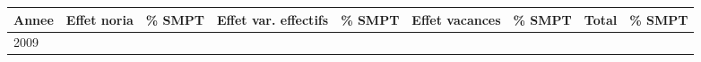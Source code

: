 \begin{longtable}[]{@{}lllllllll@{}}
\toprule
\begin{minipage}[b]{0.05\columnwidth}\raggedright
Annee\strut
\end{minipage} & \begin{minipage}[b]{0.10\columnwidth}\raggedright
Effet noria\strut
\end{minipage} & \begin{minipage}[b]{0.06\columnwidth}\raggedright
\% SMPT\strut
\end{minipage} & \begin{minipage}[b]{0.16\columnwidth}\raggedright
Effet var. effectifs\strut
\end{minipage} & \begin{minipage}[b]{0.06\columnwidth}\raggedright
\% SMPT\strut
\end{minipage} & \begin{minipage}[b]{0.12\columnwidth}\raggedright
Effet vacances\strut
\end{minipage} & \begin{minipage}[b]{0.06\columnwidth}\raggedright
\% SMPT\strut
\end{minipage} & \begin{minipage}[b]{0.09\columnwidth}\raggedright
Total\strut
\end{minipage} & \begin{minipage}[b]{0.06\columnwidth}\raggedright
\% SMPT\strut
\end{minipage}\tabularnewline
\midrule
\endhead
\begin{minipage}[t]{0.05\columnwidth}\raggedright
2009\strut
\end{minipage} & \begin{minipage}[t]{0.10\columnwidth}\raggedright
\strut
\end{minipage} & \begin{minipage}[t]{0.06\columnwidth}\raggedright
\strut
\end{minipage} & \begin{minipage}[t]{0.16\columnwidth}\raggedright
\strut
\end{minipage} & \begin{minipage}[t]{0.06\columnwidth}\raggedright
\strut
\end{minipage} & \begin{minipage}[t]{0.12\columnwidth}\raggedright
\strut
\end{minipage} & \begin{minipage}[t]{0.06\columnwidth}\raggedright

\end{minipage}
\end{longtable}
